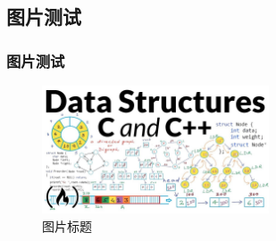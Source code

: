 \documentclass[12pt]{beamer}
\begin{document}
\subsection{图片测试}
\begin{frame}
    \frametitle{图片测试}

    \begin{figure}[H] %
        \centering %
        \includegraphics[width=0.6\textwidth]{assets/dataStructures.jpg}
        \captionsetup{font = scriptsize}  %
        \caption{图片标题} %
        \label{fig: 数据结构2} %
    \end{figure}
\end{frame}

\end{document}
